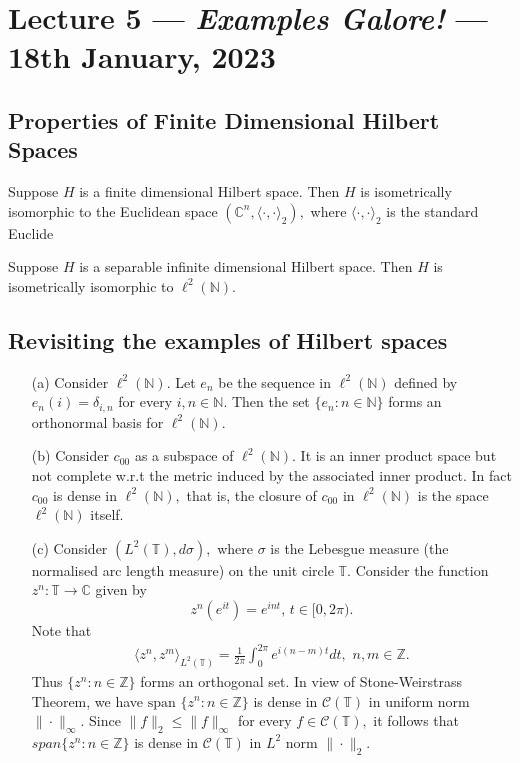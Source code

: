 \section{Lecture 5 --- \textit{Examples Galore!} --- 18th January, 2023}


\subsection{Properties of Finite Dimensional Hilbert Spaces}
\begin{proposition}
Suppose $H$ is a finite dimensional Hilbert space. Then $H$ is isometrically isomorphic to the Euclidean space $(\mathbb C^n,\langle \cdot,\cdot \rangle_2),$  where $\langle \cdot,\cdot\rangle_2$ is the standard Euclide
\end{proposition}

\begin{proposition}
 Suppose $H$ is a separable infinite dimensional Hilbert space. Then $H$ is isometrically isomorphic to $\ell^2(\mathbb N).$
 \end{proposition}

\subsection{Revisiting the examples of Hilbert spaces}
\begin{itemize}
\item[(a)] Consider $\ell^2(\mathbb N).$ Let $e_n$ be the sequence in $\ell^2(\mathbb N)$ defined by $e_n(i)=\delta_{i,n}$ for every $i,n \in \mathbb N.$ Then the set $\{e_n : n\in\mathbb N\}$ forms an orthonormal basis for $\ell^2(\mathbb N).$
\item[(b)] Consider $c_{00}$ as a subspace of $\ell^2(\mathbb N).$ It is an inner product space but not complete w.r.t the metric induced by the associated inner product. In fact $c_{00}$ is dense in $\ell^2(\mathbb N),$ that is, the closure of $c_{00}$ in $\ell^2(\mathbb N)$ is the space $\ell^2(\mathbb N)$ itself. 
\item[(c)] Consider $(L^2(\mathbb T), d\sigma),$ where $\sigma$ is the Lebesgue measure (the normalised arc length measure) on the unit circle $\mathbb T.$ Consider the function $z^n : \mathbb T \to \mathbb C$ given by $$z^n(e^{it}) = e^{int},\,t\in [0,2\pi).$$ Note that 
\begin{align*}
\langle z^n, z^m\rangle_{L^2(\mathbb T)} = \frac{1}{2\pi} \int_{0}^{2\pi} e^{i(n-m)t} dt,\,\,n,m\in\mathbb Z.
\end{align*}
Thus $\{z^n: n\in\mathbb Z\}$ forms an orthogonal set. In view of Stone-Weirstrass Theorem, we have $\text{span }\{z^n: n\in\mathbb Z\}$ is dense in $\mathscr C(\mathbb T)$ in uniform norm $\|\cdot\|_{\infty}.$ Since $\|f\|_{2} \leqslant\|f\|_{\infty}$ for every $f\in \mathscr C(\mathbb T),$ it follows that $span\{z^n: n\in\mathbb Z\}$ is dense in $\mathscr C(\mathbb T)$ in $L^2$ norm $\|\cdot\|_{2}.$ 
\end{itemize}

